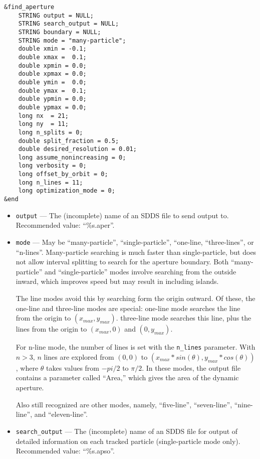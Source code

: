 \documentclass[11pt]{article}
\begin{document}
\begin{verbatim}
&find_aperture
    STRING output = NULL;
    STRING search_output = NULL;
    STRING boundary = NULL;
    STRING mode = "many-particle";
    double xmin = -0.1;
    double xmax =  0.1;
    double xpmin = 0.0;
    double xpmax = 0.0;
    double ymin =  0.0;
    double ymax =  0.1;
    double ypmin = 0.0;
    double ypmax = 0.0;
    long nx  = 21;
    long ny  = 11;
    long n_splits = 0;
    double split_fraction = 0.5;
    double desired_resolution = 0.01;
    long assume_nonincreasing = 0;
    long verbosity = 0;    
    long offset_by_orbit = 0;
    long n_lines = 11;
    long optimization_mode = 0;
&end
\end{verbatim}

\begin{itemize}
\item \verb|output| --- The (incomplete) name of an SDDS file to send output to.  
 Recommended value: ``\%s.aper''.

\item \verb|mode| --- May be ``many-particle'', ``single-particle'', ``one-line, ``three-lines'', or ``n-lines''.
Many-particle searching is much
faster than single-particle, but does not allow interval splitting to
search for the aperture boundary.  Both ``many-particle'' and
``single-particle'' modes involve searching from the outside inward,
which improves speed but may result in including islands.

The line modes avoid this by searching form the origin
outward.  Of these, the one-line and three-line modes are special:
one-line mode searches the line from the origin to $(x_{max},
y_{max})$.  three-line mode searches this line, plus the lines from
the origin to $(x_{max}, 0)$ and $(0, y_{max})$.  

For n-line mode, the number of lines is set with the \verb|n_lines| parameter.
With $n>3$, $n$ lines are explored from $(0,0)$ to
$(x_{max}*sin(\theta), y_{max}*cos(\theta))$, where $\theta$ takes
values from $-pi/2$ to $\pi/2$.   In these modes, the output file contains
a parameter called ``Area,'' which gives the area of the dynamic aperture.

Also still recognized are other modes, namely, ``five-line'', ``seven-line'', ``nine-line'',
and ``eleven-line''.

\item \verb|search_output| --- The (incomplete) name of an SDDS file for output of detailed
 information on each tracked particle (single-particle mode only).  Recommended value:
 ``\%s.apso''.


\end{itemize}
\end{document}
